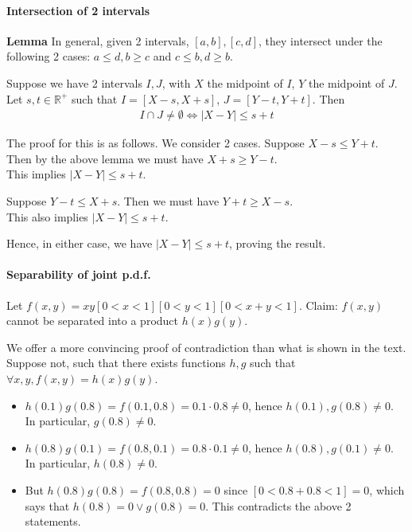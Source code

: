 \documentclass{article}
\begin{document}
\paragraph{Intersection of 2 intervals}
\textbf{Lemma} In general, given 2 intervals, $[a,b],[c,d]$, they intersect under the following 2 cases:
$a \leq d, b \geq c$ and $c\leq b, d\geq b$.


Suppose we have 2 intervals $I,J$, with $X$ the midpoint of $I$, $Y$ the midpoint of $J$. Let $s,t\in \mathbb{R}^+$ such that $I=[X-s,X+s]$, $J=[Y-t,Y+t]$. Then 
\begin{align*}
	I\cap J\neq \emptyset \iff |X-Y| \leq s+t
\end{align*}

The proof for this is as follows. We consider 2 cases.
Suppose $X-s \leq Y+t$. Then by the above lemma we must have $X+s\geq  Y-t$.\\
This implies $|X-Y|\leq s+t$.


Suppose $Y-t \leq X+s$. Then we must have $Y+t\geq X-s$.\\
This also implies $|X-Y|\leq s+t$.

Hence, in either case, we have $|X-Y|\leq s+t$, proving the result.


\paragraph{Separability of joint p.d.f.} Let $f(x,y) = xy[0<x<1][0<y<1][0<x+y<1]$. Claim: $f(x,y)$ cannot be separated into a product $h(x)g(y)$.

We offer a more convincing proof of contradiction than what is shown in the text. Suppose not, such that there exists functions $h,g$ such that $\forall x,y, f(x,y) = h(x)g(y)$.

\begin{itemize}
	\item $h(0.1)g(0.8) = f(0.1,0.8) = 0.1\cdot 0.8\neq 0$, hence $h(0.1), g(0.8)\neq 0$. In particular, $g(0.8)\neq 0$.
	\item $h(0.8)g(0.1) = f(0.8,0.1) = 0.8\cdot 0.1\neq 0$, hence $h(0.8), g(0.1)\neq 0$. In particular, $h(0.8)\neq 0$.
	\item But $h(0.8)g(0.8) = f(0.8,0.8) = 0$ since $[0 < 0.8 + 0.8 < 1] = 0$, which says that $h(0.8) = 0\lor g(0.8) = 0$. This contradicts the above 2 statements.
\end{itemize}
\end{document}

